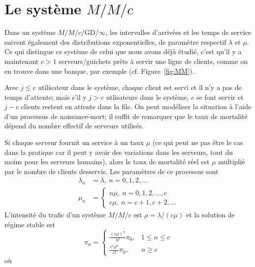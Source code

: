 \section{Le système $M/M/c$}
Dans un système $M/M/c/\textrm{GD}/\infty$, les intervalles d'arrivées et les temps de service suivent également des distributions exponentielles, de paramètre respectif $\lambda$ et $\mu$. Ce qui distingue ce système de celui que nous avons déjà étudié, c'est qu'il y a maintenant  $c>1$ serveurs/guichets prêts à servir une ligne de clients, comme on en trouve dans une banque, par exemple (cf. Figure~\ref{fig:MM}). \par Avec $j \leq c$ utilisateur dans le système,  chaque client est servi et il n'y a pas de temps d'attente; mais s'il y $j > c$ utlisateurs dans le système, $c$ se font servir et $j - c$ clients  restent en attente dans la file. \newl
On peut modéliser la situation à l'aide d'un processus de naissance-mort; il suffit de remarquer que le taux de mortalité dépend du nombre effectif de serveurs utilisés. \par Si chaque serveur fournit un service à un taux $\mu$ (ce qui peut ne pas être le cas dans la pratique car il peut y avoir des variations dans les serveurs, tout du moins pour les serveurs humains), alors le taux de mortalité réel est $\mu$ multiplié par le nombre de clients desservis. Les paramètres de ce processus sont
\begin{align*}
\lambda_{n} &= \lambda, \ n=0,1,2,\ldots \\ 
\mu_n &= \begin{cases}n\mu, \ n=0,1,2, \ldots, c \\
 c\mu,\  n=c+1,c+2,\ldots
\end{cases}
\end{align*}
L'intensité du trafic d'un système $M/M/c$ est $\rho = \lambda/(c \mu)$ et la solution de régime stable est 
$$
 \pi_{n} = 
\begin{cases}
     \frac{\left(c \rho\right)^{n}}{n!} \pi_{0},      & \text{$1\leq n \leq c$}  \\ 
     \frac{c^{c} \rho^{n}}{c!} \pi_{0},   & \text{$n \geq c$} 
\end{cases}
$$
où
